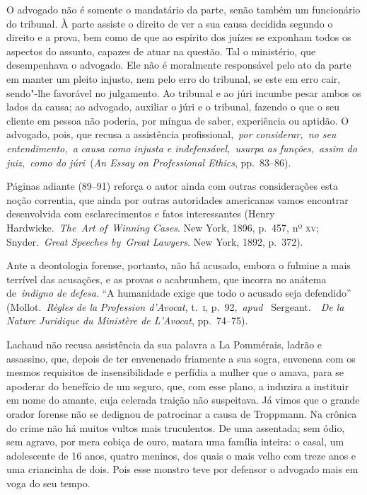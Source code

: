 \begin{hedraquote}
O advogado não é somente o mandatário da parte, senão também um 
funcionário do tribunal. À parte
assiste o direito de ver a sua causa decidida segundo o direito e a
prova, bem como de que ao espírito dos juízes se exponham todos os
aspectos do assunto, capazes de atuar na questão. Tal o ministério, que
desempenhava o advogado. Ele não é moralmente responsável pelo ato da
parte em manter um pleito injusto, nem pelo erro do tribunal, se este
em erro cair, sendo"-lhe favorável no julgamento. Ao tribunal e ao júri
incumbe pesar ambos os lados da causa; ao advogado, auxiliar o júri e o
tribunal, fazendo o que o seu cliente em pessoa não poderia, por míngua
de saber, experiência ou aptidão. O advogado, pois, que recusa a
assistência profissional, \textit{por considerar, no seu
entendimento, a} \textit{causa como injusta e indefensável, usurpa as
funções, assim do} \textit{juiz, como do júri} (\textit{An Essay on
Professional Ethics}, pp.~83--86). 
\end{hedraquote}

Páginas adiante (89--91) reforça o
autor ainda com outras considerações esta noção correntia, que ainda
por outras autoridades americanas vamos encontrar desenvolvida com
esclarecimentos e fatos interessantes (Henry Hardwicke. \textit{The Art
of Winning Cases}. New York, 1896, p.~457, nº \textsc{xv};
Snyder. \textit{Great Speeches by Great} \textit{Lawyers}. New York,
1892, p.~372). 

Ante a deontologia forense, portanto, não há acusado,
embora o fulmine a mais terrível das acusações, e as provas o
acabrunhem, que incorra no anátema de \textit{indigno de defesa}. “A
humanidade exige que todo o acusado seja defendido”
(Mollot. \textit{Règles de la} \textit{Profession d'Avocat}, t.~\textsc{i}, 
p.~92, \textit{apud } Sergeant.  \textit{De la Nature} \textit{Juridique
du Ministère de L'Avocat}, pp.~74--75). 

Lachaud não recusa assistência da
sua palavra a La Pommérais, ladrão e assassino, que, depois de ter
envenenado friamente a sua sogra, envenena com os mesmos requisitos de
insensibilidade e perfídia a mulher que o amava, para se apoderar do
benefício de um seguro, que, com esse plano, a induzira a instituir em
nome do amante, cuja celerada traição não suspeitava. Já vimos que o
grande orador forense não se dedignou de patrocinar a causa de
Troppmann. Na crônica do crime não há muitos vultos mais truculentos.
De uma assentada; sem ódio, sem agravo, por mera cobiça de ouro, matara
uma família inteira: o casal, um adolescente de 16 anos, quatro
meninos, dos quais o mais velho com treze anos e uma criancinha de
dois. Pois esse monstro teve por defensor o advogado mais em voga do
seu tempo. 

